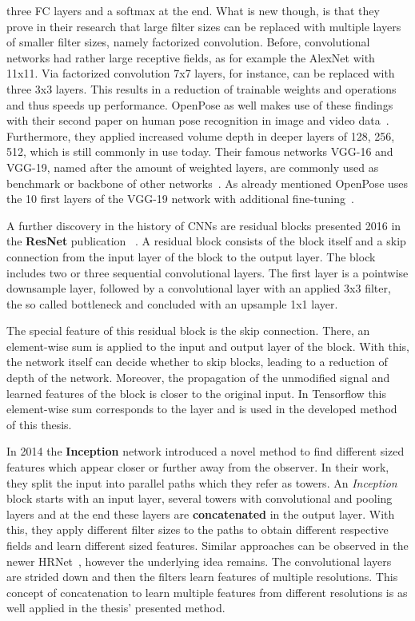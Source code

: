 three \gls{FC} layers and a softmax at the end.
What is new though, is that they prove in their research that large filter sizes can be replaced with multiple layers of smaller filter sizes, namely
factorized convolution.
Before, convolutional networks had rather large receptive fields, as for example the AlexNet with 11x11.
Via factorized convolution 7x7 layers, for instance, can be replaced with three 3x3 layers.
This results in a reduction of trainable weights and operations and thus speeds up performance.
OpenPose as well makes use of these findings with their second paper on human pose recognition in image and video data~\cite{openpose}.
Furthermore, they applied increased volume depth in deeper layers of 128, 256, 512, which is still commonly in use today.
Their famous networks VGG-16 and VGG-19, named after the amount of weighted layers, are commonly used as benchmark or
backbone of other networks~\cite{advanceddeeplearningpython}.
As already mentioned OpenPose uses the 10 first layers of the VGG-19 network with additional fine-tuning~\cite{openpose}.

A further discovery in the history of \glspl{CNN} are residual blocks presented 2016 in the \textbf{ResNet} publication ~\cite{resnet}.
A residual block consists of the block itself and a skip connection from the input layer of the block to the output layer.
The block includes two or three sequential convolutional layers. The first layer is a pointwise downsample layer,
followed by a convolutional layer with an applied 3x3 filter, the so called bottleneck and concluded with an upsample 1x1 layer.

The special feature of this residual block is the skip connection.
There, an element-wise sum is applied to the input and
output layer of the block.
With this, the network itself can decide whether to skip blocks, leading to a reduction of depth of the network.
Moreover, the propagation of the unmodified signal and learned features
of the block is closer to the original input.
In Tensorflow this element-wise sum corresponds to the  layer and is used in the developed
method of this thesis.

In 2014 the \textbf{Inception} network introduced a novel method to find different sized features which appear closer or
further away from the observer.
In their work, they split the input into parallel paths which they refer as towers.
An \textit{Inception} block starts with an input layer, several towers with convolutional and pooling layers and at the end
these layers are \textbf{concatenated} in the output layer.
With this, they apply different filter sizes to the paths to obtain different respective fields and learn different sized features.
Similar approaches can be observed in the newer HRNet~\cite{HRNetv2}, however the underlying idea remains.
The convolutional layers are strided down and then the filters learn features of multiple resolutions.
This concept of concatenation to learn multiple features from different resolutions is as well applied in the thesis'
presented method.


